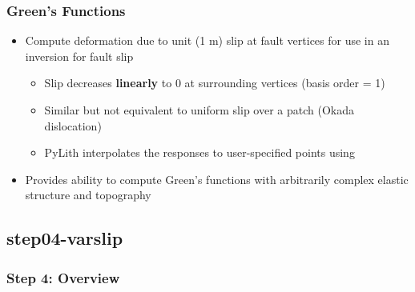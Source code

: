 \documentclass{beamer}
\begin{document}
\begin{frame}
  \frametitle{Green's Functions}
  \summary{}

  \begin{itemize}
  \item Compute deformation due to unit (1 m) slip at fault vertices for use in an inversion for fault slip
    \begin{itemize}
    \item Slip decreases {\bf linearly} to 0 at surrounding vertices (basis order = 1)
    \item Similar but not equivalent to uniform slip over a patch (Okada dislocation)
    \item PyLith interpolates the responses to user-specified points using 
    \end{itemize}
  \item Provides ability to compute Green's functions with arbitrarily complex elastic structure and topography
  \end{itemize}
  
\end{frame}


\subsection{step04-varslip}

\begin{frame}
  \frametitle{Step 4: Overview}

      
\end{frame}
\end{document}
